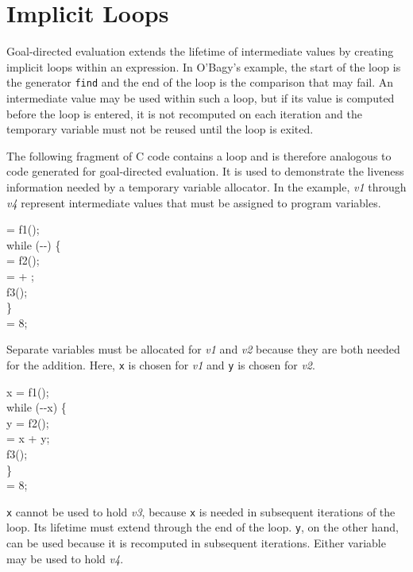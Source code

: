 \section{Implicit Loops}

Goal-directed evaluation extends the lifetime of intermediate values
by creating implicit loops within an expression. In O'Bagy's example,
the start of the loop is the generator \texttt{find} and the end of
the loop is the comparison that may fail.  An intermediate value may
be used within such a loop, but if its value is computed before the
loop is entered, it is not recomputed on each iteration and the
temporary variable must not be reused until the loop is exited.

The following fragment of C code contains a loop and is therefore
analogous to code generated for goal-directed evaluation. It is used
to demonstrate the liveness information needed by a temporary variable
allocator. In the example, \textit{v1} through \textit{v4} represent
intermediate values that must be assigned to program variables.

\goodbreak
\begin{iconcode}
 = f1();\\
while (-{}-) \{\\
\> = f2();\\
\> =  + ;\\
\>f3();\\
\>\}\\
 = 8;\\
\end{iconcode}

Separate variables must be allocated for \textit{v1} and \textit{v2} because
they are both needed for the addition. Here, \texttt{x} is chosen for
\textit{v1} and \texttt{y} is chosen for \textit{v2}.

\goodbreak
\begin{iconcode}
x = f1();\\
while (-{}-x) \{\\
\>y = f2();\\
\> = x + y;\\
\>f3();\\
\>\}\\
 = 8;\\
\end{iconcode}



\texttt{x} cannot be used to hold \textit{v3}, because \texttt{x} is needed in
subsequent iterations of the loop. Its lifetime must extend through
the end of the loop. \texttt{y}, on the other hand, can be used because it is
recomputed in subsequent iterations.  Either variable may be used to
hold \textit{v4}.

